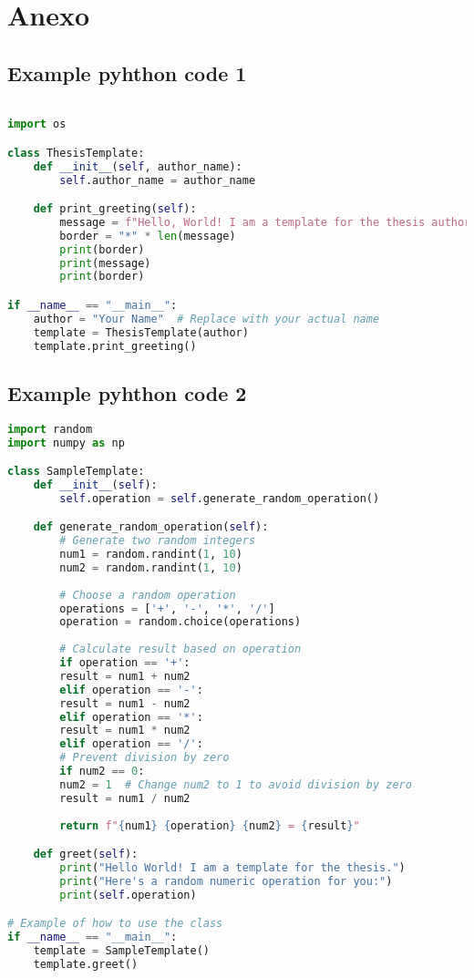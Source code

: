 \chapter*{Anexo}
\section*{Example pyhthon code 1}\label{anexo1}
\begin{lstlisting}[language=Python]

import os

class ThesisTemplate:
	def __init__(self, author_name):
		self.author_name = author_name

	def print_greeting(self):
		message = f"Hello, World! I am a template for the thesis authored by {self.author_name}."
		border = "*" * len(message)
		print(border)
		print(message)
		print(border)

if __name__ == "__main__":
	author = "Your Name"  # Replace with your actual name
	template = ThesisTemplate(author)
	template.print_greeting()
\end{lstlisting}


\section*{Example pyhthon code 2}\label{anexo2}
\begin{lstlisting}[language=Python]
import random
import numpy as np

class SampleTemplate:
	def __init__(self):
		self.operation = self.generate_random_operation()

	def generate_random_operation(self):
		# Generate two random integers
		num1 = random.randint(1, 10)
		num2 = random.randint(1, 10)
		
		# Choose a random operation 
		operations = ['+', '-', '*', '/']
		operation = random.choice(operations)
		
		# Calculate result based on operation
		if operation == '+':
		result = num1 + num2
		elif operation == '-':
		result = num1 - num2
		elif operation == '*':
		result = num1 * num2
		elif operation == '/':
		# Prevent division by zero
		if num2 == 0:
		num2 = 1  # Change num2 to 1 to avoid division by zero
		result = num1 / num2
		
		return f"{num1} {operation} {num2} = {result}"

	def greet(self):
		print("Hello World! I am a template for the thesis.")
		print("Here's a random numeric operation for you:")
		print(self.operation)

# Example of how to use the class
if __name__ == "__main__":
	template = SampleTemplate()
	template.greet()
	


\end{lstlisting}